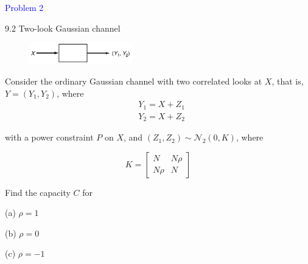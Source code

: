 \textcolor{blue}{Problem 2}

9.2 Two-look Gaussian channel

\begin{figure}[htbp]
    \centering
	\includegraphics[width=0.4\textwidth]{../figure/9_1_9_2.png}
\end{figure}
Consider the ordinary Gaussian channel with two correlated looks at $X$, that is, $Y=\left(Y_1, Y_2\right)$, where
\begin{align*}
& Y_1=X+Z_1 \\
& Y_2=X+Z_2
\end{align*}

with a power constraint $P$ on $X$, and $\left(Z_1, Z_2\right) \sim \mathcal{N}_2(0, K)$, where

$$
K=\left[\begin{array}{ll}
N & N\rho \\
N\rho & N
\end{array}\right]
$$

Find the capacity $C$ for

(a) $\rho=1$

(b) $\rho=0$

(c) $\rho=-1$

